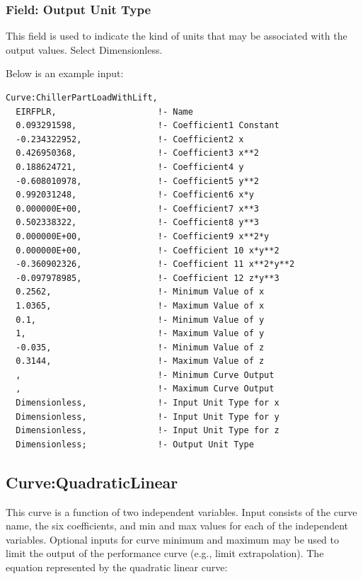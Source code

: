 \subsubsection{Field: Output Unit Type}\label{field-output-unit-type-8}

This field is used to indicate the kind of units that may be associated with the output values. Select Dimensionless.

Below is an example input:

\begin{lstlisting}
Curve:ChillerPartLoadWithLift,
  EIRFPLR,                    !- Name
  0.093291598,                !- Coefficient1 Constant
  -0.234322952,               !- Coefficient2 x
  0.426950368,                !- Coefficient3 x**2
  0.188624721,                !- Coefficient4 y
  -0.608010978,               !- Coefficient5 y**2
  0.992031248,                !- Coefficient6 x*y
  0.000000E+00,               !- Coefficient7 x**3
  0.502338322,                !- Coefficient8 y**3
  0.000000E+00,               !- Coefficient9 x**2*y
  0.000000E+00,               !- Coefficient 10 x*y**2
  -0.360902326,               !- Coefficient 11 x**2*y**2
  -0.097978985,               !- Coefficient 12 z*y**3
  0.2562,                     !- Minimum Value of x
  1.0365,                     !- Maximum Value of x
  0.1,                        !- Minimum Value of y
  1,                          !- Maximum Value of y
  -0.035,                     !- Minimum Value of z
  0.3144,                     !- Maximum Value of z
  ,                           !- Minimum Curve Output
  ,                           !- Maximum Curve Output
  Dimensionless,              !- Input Unit Type for x
  Dimensionless,              !- Input Unit Type for y
  Dimensionless,              !- Input Unit Type for z
  Dimensionless;              !- Output Unit Type
\end{lstlisting}

\subsection{Curve:QuadraticLinear}\label{curvequadraticlinear}

This curve is a function of two independent variables. Input consists of the curve name, the six coefficients, and min and max values for each of the independent variables. Optional inputs for curve minimum and maximum may be used to limit the output of the performance curve (e.g., limit extrapolation). The equation represented by the quadratic linear curve:

